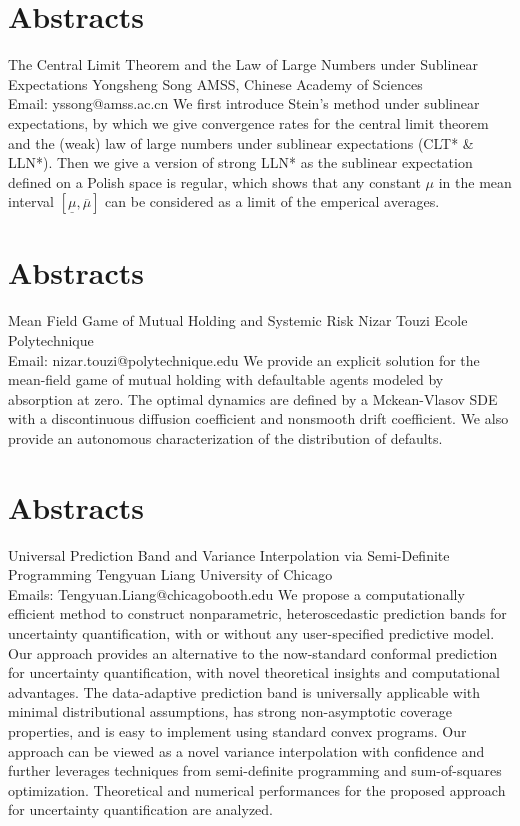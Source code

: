 \documentclass[
	openany, %
	parskip=full, %
	12pt, %
	a4paper, %
]{conferencebooklet} %
\begin{document}
\chapter*{Abstracts}
\abstract
    {The Central Limit Theorem and the Law of Large Numbers
    under Sublinear Expectations}
    {Yongsheng Song}
    {}
    {AMSS, Chinese Academy of Sciences\\
    Email: yssong@amss.ac.cn}
    {We first introduce Stein's method under sublinear expectations, by which we give convergence rates for the central limit theorem and the (weak) law of large numbers under sublinear expectations (CLT* \& LLN*). Then we give a version of strong LLN*  as the sublinear expectation defined on a Polish space is regular, which shows that any constant $\mu$ in the mean interval $[\underline{\mu},\overline{\mu}]$ can be considered as a limit of the emperical averages.}


\chapter*{Abstracts}
\abstract
    {Mean Field Game of Mutual Holding and Systemic Risk}
    {Nizar Touzi}
    {}
    {Ecole Polytechnique\\
    Email: nizar.touzi@polytechnique.edu}
    {We provide an explicit solution for the mean-field game of mutual holding with defaultable agents modeled by absorption at zero. The optimal dynamics are defined by a Mckean-Vlasov SDE with a discontinuous diffusion coefficient and nonsmooth drift coefficient. We also provide an autonomous characterization of the distribution of defaults.}



\chapter*{Abstracts}
\abstract
    {Universal Prediction Band and Variance Interpolation via Semi-Definite Programming}
    {Tengyuan Liang}
    {}
    {University of Chicago\\
    Emails: Tengyuan.Liang@chicagobooth.edu}
    {We propose a computationally efficient method to construct nonparametric, heteroscedastic prediction bands for uncertainty quantification, with or without any user-specified predictive model. Our approach provides an alternative to the now-standard conformal prediction for uncertainty quantification, with novel theoretical insights and computational advantages. The data-adaptive prediction band is universally applicable with minimal distributional assumptions, has strong non-asymptotic coverage properties, and is easy to implement using standard convex programs. Our approach can be viewed as a novel variance interpolation with confidence and further leverages techniques from semi-definite programming and sum-of-squares optimization. Theoretical and numerical performances for the proposed approach for uncertainty quantification are analyzed.}
\end{document}
